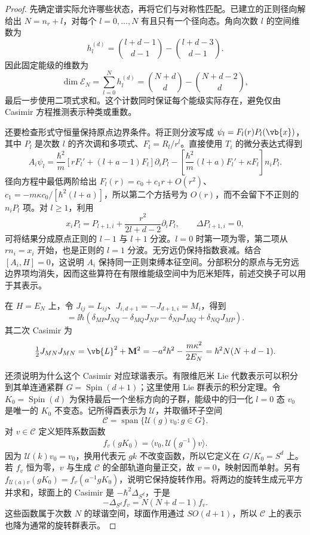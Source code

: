 \begin{proof}
先确定谱实际允许哪些状态，再将它们与对称性匹配。已建立的正则径向解给出 $N=n_r+l$，对每个 $l=0,\ldots,N$ 有且只有一个径向态。角向次数 $l$ 的空间维数为
\[
 h_l^{(d)}=\binom{l+d-1}{d-1}-\binom{l+d-3}{d-1}.
\]
因此固定能级的维数为
\[
 \dim\mathcal E_N=\sum_{l=0}^Nh_l^{(d)}
 =\binom{N+d}{d}-\binom{N+d-2}{d},
\]
最后一步使用二项式求和。这个计数同时保证每个能级实际存在，避免仅由 Casimir 方程推测表示种类或重数。

还要检查形式守恒量保持原点边界条件。将正则分波写成 $\psi_l=F_l(r)P_l(\vb{x})$，其中 $P_l$ 是次数 $l$ 的齐次调和多项式、$F_l=R_l/r^l$。直接使用 $T_i$ 的微分表达式得到
\[
 A_i\psi_l=\frac{\hbar^2}{m}
 [rF_l'+(l+a-1)F_l]\partial_iP_l
 -\left[\frac{\hbar^2}{m}(l+a)F_l'+\kappa F_l\right]n_iP_l.
\]
径向方程中最低两阶给出
$F_l(r)=c_0+c_1r+O(r^2)$、
$c_1=-m\kappa c_0/[\hbar^2(l+a)]$，所以第二个方括号为 $O(r)$，而不会留下不正则的 $n_iP_l$ 项。对 $l\ge1$，利用
\[
 x_iP_l=P_{l+1,i}+\frac{r^2}{2l+d-2}\partial_iP_l,
 \qquad \Delta P_{l+1,i}=0,
\]
可将结果分成原点正则的 $l-1$ 与 $l+1$ 分波。$l=0$ 时第一项为零，第二项从 $r n_i=x_i$ 开始，也是正则的 $l=1$ 分波。无穷远仍保持指数衰减。结合 $[A_i,H]=0$，这说明 $A_i$ 保持同一正则束缚本征空间。分部积分的原点与无穷远边界项均消失，因而这些算符在有限维能级空间中为厄米矩阵，前述交换子可以用于其表示。

在 $H=E_N$ 上，令 $J_{ij}=L_{ij}$、$J_{i,d+1}=-J_{d+1,i}=M_i$，得到
\begin{equation}
 [J_{MN},J_{PQ}]=\ii\hbar(
 \delta_{MP}J_{NQ}-\delta_{MQ}J_{NP}
 -\delta_{NP}J_{MQ}+\delta_{NQ}J_{MP}).
 \label{eq:phys-hdqm-sod1-algebra}
\end{equation}
其二次 Casimir 为
\[
 \tfrac12J_{MN}J_{MN}=\vb{L}^2+\mathbf M^2
 =-a^2\hbar^2-\frac{m\kappa^2}{2E_N}
 =\hbar^2N(N+d-1).
\]

还须说明为什么这个 Casimir 对应球谐表示。有限维厄米 Lie 代数表示可以积分到其单连通紧群 $G=\operatorname{Spin}(d+1)$；这里使用 Lie 群表示的积分定理。令 $K_0=\operatorname{Spin}(d)$ 为保持最后一个坐标方向的子群，能级中的归一化 $l=0$ 态 $v_0$ 是唯一的 $K_0$ 不变态。记所得酉表示为 $\mathcal U$，并取循环子空间
\[
 \mathcal C=\operatorname{span}\{\mathcal U(g)v_0:g\in G\}.
\]
对 $v\in\mathcal C$ 定义矩阵系数函数
\[
 f_v(gK_0)=\langle v_0,\mathcal U(g^{-1})v\rangle.
\]
因为 $\mathcal U(k)v_0=v_0$，换用代表元 $gk$ 不改变函数，所以它定义在 $G/K_0=S^d$ 上。若 $f_v$ 恒为零，$v$ 与生成 $\mathcal C$ 的全部轨道向量正交，故 $v=0$，映射因而单射。另有
$f_{\mathcal U(a)v}(gK_0)=f_v(a^{-1}gK_0)$，说明它保持旋转作用。将两边的旋转生成元平方并求和，球面上的 Casimir 是 $-\hbar^2\Delta_{S^d}$，于是
\[
 -\Delta_{S^d}f_v=N(N+d-1)f_v.
\]
这些函数属于次数 $N$ 的球谐空间，球面作用通过 $SO(d+1)$，所以 $\mathcal C$ 上的表示也降为通常的旋转群表示。


\end{proof}
